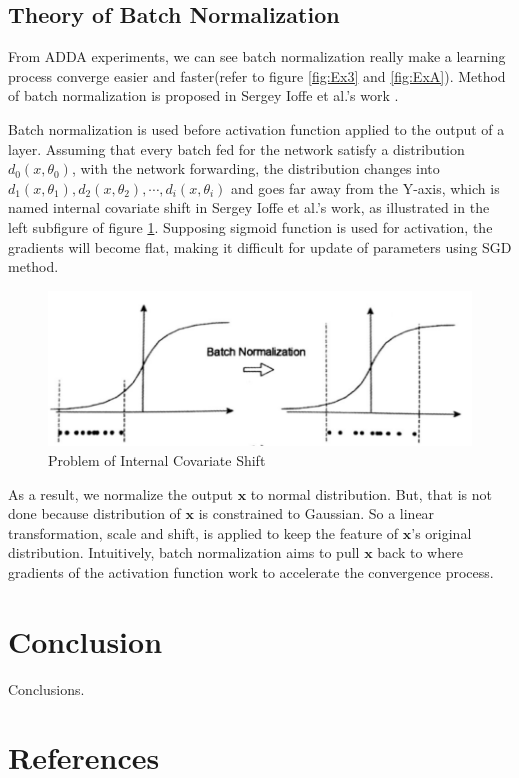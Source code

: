 \documentclass[conference]{IEEEtran}
\begin{document}
\subsection{Theory of Batch Normalization}
From ADDA experiments, we can see batch normalization really make a learning process converge easier and faster(refer to figure \ref{fig:Ex3} and \ref{fig:ExA}). Method of batch normalization is proposed in Sergey Ioffe et al.'s work \cite{BN1}.

Batch normalization is used before activation function applied to the output of a layer. Assuming that every batch fed for the network satisfy a distribution $d_0(x, \theta_0)$, with the network forwarding, the distribution changes into $d_1(x, \theta_1), d_2(x, \theta_2), \cdots, d_i(x, \theta_i)$ and goes far away from the Y-axis, which is named internal covariate shift in Sergey Ioffe et al.'s work\cite{BN1}, as illustrated in the left subfigure of figure \ref{fig:BN_theorem1}. Supposing sigmoid function is used for activation, the gradients will become flat, making it difficult for update of parameters using SGD method.
\begin{figure}
  \centering
  \includegraphics[width=.4\textwidth]{LBN_theorem1.jpg}
  \caption{Problem of Internal Covariate Shift}
  \label{fig:BN_theorem1}
\end{figure}
As a result, we normalize the output $\mathbf{x}$ to normal distribution. But, that is not done because distribution of $\mathbf{x}$ is constrained to Gaussian. So a linear transformation, scale and shift, is applied to keep the feature of $\mathbf{x}$'s original distribution. Intuitively, batch normalization aims to pull $\mathbf{x}$ back to where gradients of the activation function work to accelerate the convergence process.

\section{Conclusion}
Conclusions.


\section*{References}
\end{document}
